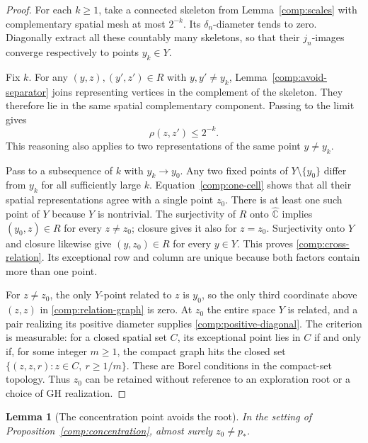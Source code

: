 \documentclass[11pt]{article}
\numberwithin{equation}{section}
\newtheorem{lemma}[theorem]{Lemma}
\theoremstyle{definition}
\theoremstyle{remark}
\newcommand{\Chat}{\widehat{\mathbb C}}
\newcommand{\1}{\mathbf 1}
\begin{document}
\begin{proof}
For each $k\ge1$, take a connected skeleton from
Lemma~\ref{comp:scales} with complementary spatial mesh at most
$2^{-k}$.  Its $\delta_n$-diameter tends to zero.  Diagonally
extract all these countably many skeletons, so that their
$j_n$-images converge respectively to points $y_k\in Y$.

Fix $k$.  For any $(y,z),(y',z')\in R$ with $y,y'\ne y_k$,
Lemma~\ref{comp:avoid-separator} joins representing vertices in
the complement of the skeleton.  They therefore lie in the same
spatial complementary component.  Passing to the limit gives
\begin{equation}
 \label{comp:one-cell}
 \rho(z,z')\le2^{-k}.
\end{equation}
This reasoning also applies to two representations of the same
point $y\ne y_k$.

Pass to a subsequence of $k$ with $y_k\to y_0$.  Any two fixed
points of $Y\setminus\{y_0\}$ differ from $y_k$ for all sufficiently
large $k$.  Equation~\eqref{comp:one-cell} shows that all their
spatial representations agree with a single point $z_0$.  There
is at least one such point of $Y$ because $Y$ is nontrivial.  The
surjectivity of $R$ onto $\Chat$ implies
$(y_0,z)\in R$ for every $z\ne z_0$; closure gives it also for
$z=z_0$.  Surjectivity onto $Y$ and closure likewise give
$(y,z_0)\in R$ for every $y\in Y$.  This proves
\eqref{comp:cross-relation}.  Its exceptional row and column are
unique because both factors contain more than one point.

For $z\ne z_0$, the only $Y$-point related to $z$ is $y_0$, so
the only third coordinate above $(z,z)$ in
\eqref{comp:relation-graph} is zero.  At $z_0$ the entire space $Y$
is related, and a pair realizing its positive diameter supplies
\eqref{comp:positive-diagonal}.  The criterion is measurable:
for a closed spatial set $C$, its exceptional point lies in $C$
if and only if, for some integer $m\ge1$, the compact graph hits
the closed set $\{(z,z,r):z\in C,\ r\ge1/m\}$.  These are Borel
conditions in the compact-set topology.  Thus $z_0$ can be retained
without reference to an exploration root or a choice of GH
realization.
\end{proof}

\begin{lemma}[The concentration point avoids the root]
\label{comp:root-avoidance}
In the setting of Proposition~\ref{comp:concentration}, almost
surely $z_0\ne p_*$.
\end{lemma}
\end{document}

